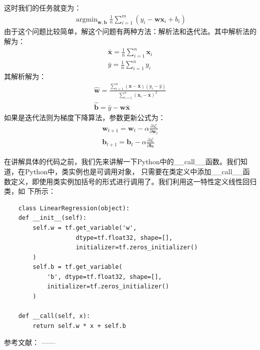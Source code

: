 \documentclass{article}
\begin{document}
这时我们的任务就变为：
\begin{equation}
    \begin{aligned}
        \mathop{\arg \min}_{\boldsymbol{w}, \boldsymbol{b}} \frac{1}{n}\sum_{i=1}^{m}(y_{i} - \boldsymbol{w} \boldsymbol{x}_{i} + b_{i})
    \end{aligned}
    \label{e000003}
\end{equation}
由于这个问题比较简单，解这个问题有两种方法：解析法和迭代法。其中解析法的解为：
\begin{equation}
    \begin{aligned}
        \bar{\boldsymbol{x}}=\frac{1}{n} \sum_{i=1}^{n} \boldsymbol{x}_{i} \\
        \bar{y}=\frac{1}{n} \sum_{i=1}^{n} y_{i}
    \end{aligned}
    \label{e000004}
\end{equation}
其解析解为：
\begin{equation}
    \begin{aligned}
        \hat{\boldsymbol{w}}=\frac{\sum_{i=1}^{n}(\boldsymbol{x} - \bar{\boldsymbol{x}})(y_{i}-\bar{y})}{\sum_{i=1}^{n}(\boldsymbol{x}_{i} - \bar{\boldsymbol{x}})^{2}} \\
        \hat{\boldsymbol{b}}=\bar{y}-\boldsymbol{w} \bar{\boldsymbol{x}}
    \end{aligned}
    \label{e000005}
\end{equation}
如果是迭代法则为梯度下降算法，参数更新公式为：
\begin{equation}
    \begin{aligned}
        \boldsymbol{w}_{t+1}=\boldsymbol{w}_{t}  - \alpha \frac{\partial{\mathcal{L}}}{\partial{\boldsymbol{w}_{t}}} \\
        \boldsymbol{b}_{t+1} = \boldsymbol{b}_{t} - \alpha \frac{\partial{\mathcal{L}}}{\partial{\boldsymbol{b}_{t}}}
    \end{aligned}
    \label{e000006}
\end{equation}


在讲解具体的代码之前，我们先来讲解一下Python中的\_\_call\_\_函数。我们知道，在Python中，类实例也是可调用对象，
只需要在类定义中添加\_\_call\_\_函数定义，即使用类实例加括号的形式进行调用了。我们利用这一特性定义线性回归类，如
下所示：
\begin{lstlisting}
    class LinearRegression(object):
    def __init__(self):
        self.w = tf.get_variable('w', 
                    dtype=tf.float32, shape=[], 
                    initializer=tf.zeros_initializer()
        )
        self.b = tf.get_variable(
            'b', dtype=tf.float32, shape=[],
            initializer=tf.zeros_initializer()
        )

    def __call(self, x):
        return self.w * x + self.b
\end{lstlisting}










参考文献：
\cite{ex1}---\cite{ex2}---\cite{refa001}

\newpage




\appendix
\end{document}
